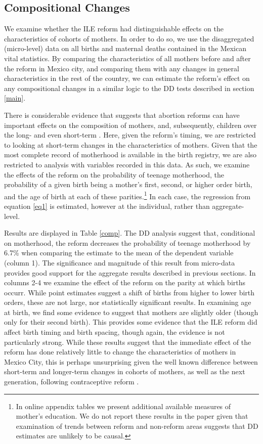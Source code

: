 \documentclass[a4paper, 11pt]{article}
\begin{document}
\begin{spacing}{2}
\subsection{Compositional Changes}\label{CompositionalChanges}
We examine whether the ILE reform had distinguishable effects on the characteristics of cohorts of mothers.  In order to do so, we use the disaggregated (micro-level) data on all births and maternal deaths contained in the Mexican vital statistics.  By comparing the characteristics of all mothers before and after the reform in Mexico city, and comparing them with any changes in general characteristics in the rest of the country, we can estimate the reform's effect on any compositional changes in a similar logic to the DD tests described in section \ref{main}. 

There is considerable evidence that suggests that abortion reforms can have important effects on the composition of mothers, and, subsequently, children over the long- \citep{Ananatetal2009,Pop-Eleches,Bailey2013} and even short-term \citep{Baileyetal2014}.  Here, given the reform's timing, we are restricted to looking at short-term changes in the characteristics of mothers.  Given that the most complete record of motherhood is available in the birth registry, we are also restricted to analysis with variables recorded in this data.  As such, we examine the effects of the reform on the probability of teenage motherhood, the probability of a given birth being a mother's first, second, or higher order birth, and the age of birth at each of these parities.\footnote{In online appendix tables we present additional available measures of mother's education.  We do not report these results in the paper given that examination of trends between reform and non-reform areas suggests that DD estimates are unlikely to be causal.}  In each case, the regression from equation \ref{eq1} is estimated, however at the individual, rather than aggregate-level.

Results are displayed in Table \ref{comp}. The DD analysis suggest that, conditional on motherhood, the reform decreases the probability of teenage motherhood by 6.7\% when comparing the estimate to the mean of the dependent variable (column 1). The significance and magnitude of this result from micro-data provides good support for the aggregate results described in previous sections.  In columns 2-4 we examine the effect of the reform on the parity at which births occurr.  While point estimates suggest a shift of births from higher to lower birth orders, these are not large, nor statistically significant results.  In examining age at birth, we find some evidence to suggest that mothers are slightly older (though only for their second birth).  This provides some evidence that the ILE reform did affect birth timing and birth spacing, though again, the evidence is not particularly strong.  While these results suggest that the immediate effect of the reform has done relatively little to change the characteristics of mothers in Mexico City, this is perhaps unsurprising given the well known difference between short-term and longer-term changes in cohorts of mothers, as well as the next generation, following contraceptive reform \citep{Ananatetal2009,Gruberetal1999}.


\end{spacing}
\end{document}
